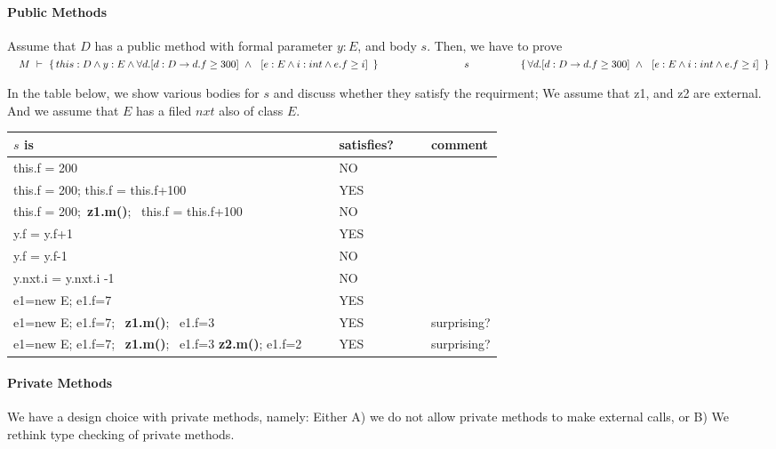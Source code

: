 \paragraph{Public Methods}
Assume that $D$ has a public method  with formal parameter $y:E$, and body $s$. Then, we have to prove\\
$\strut \ \ \  \hprovesTwoLines {M} {this:D \wedge y:E \wedge  \forall d.[d:D \rightarrow d.f\geq 300]\ \wedge\  \  [ e:E \wedge i:int \wedge e.f \geq i]\ } {s}
{\forall d.[d:D \rightarrow d.f\geq 300]\ \wedge\  \  [ e:E \wedge i:int \wedge e.f \geq i]\ }$

\vspace{.1cm}

In the table below, we show various bodies for $s$ and discuss whether they satisfy the requirment; We assume that z1, and z2 are   external. And we assume that $E$ has a filed $nxt$ also of class $E$.

\begin{tabular}{lclcl}
$s$ is & & satisfies? &  & comment\\
\hline  
 this.f = 200  &\ \  & NO\\
  this.f = 200; this.f = this.f+100  & & YES\\
  this.f = 200;\   \textbf{z1.m()};  \ this.f = this.f+100  & & NO\\
  y.f = y.f+1   & & YES   \\
  y.f = y.f-1   & & NO & \ \  &  \\
 y.nxt.i = y.nxt.i -1   & & NO\\
 e1=new E; e1.f=7 & & YES\\
 e1=new E; e1.f=7; \   \textbf{z1.m()};  \ e1.f=3 &  & YES & & surprising?\\
  e1=new E; e1.f=7; \  \textbf{z1.m()};  \ e1.f=3  \textbf{z2.m()};  e1.f=2 &  & YES & & surprising?\\
 \hline
\end{tabular}

\paragraph{Private Methods}
\label{s:privateMs}
We have a design choice with private methods, namely: Either A) we do not allow private methods to make external calls, or B) We rethink type checking of
private methods. 

